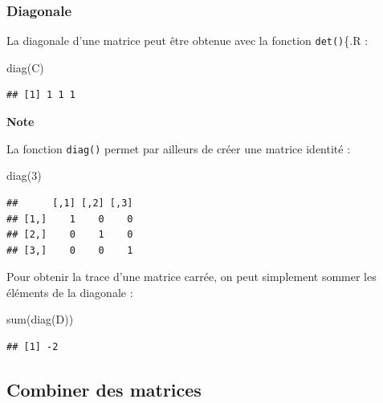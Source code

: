 \documentclass[
  11pt,
]{book}
\newenvironment{Shaded}{\begin{snugshade}}{\end{snugshade}}
\newcommand{\DecValTok}[1]{\textcolor[rgb]{0.00,0.00,0.81}{#1}}
\newcommand{\FunctionTok}[1]{\textcolor[rgb]{0.00,0.00,0.00}{#1}}
\newcommand{\NormalTok}[1]{#1}
\numberwithin{equation}{section}
\numberwithin{countremarque}{section}
\newenvironment{notebox}{
  \begin{tcolorbox}[breakable, colback=jaune,coltext=black,
                  colframe=grisfonce]}
 {\end{tcolorbox}}
\begin{document}
\hypertarget{diagonale}{%
\subsubsection{Diagonale}\label{diagonale}}

La diagonale d'une matrice peut être obtenue avec la fonction \texttt{det()}\{.R :

\begin{Shaded}
\begin{Highlighting}[]
\FunctionTok{diag}\NormalTok{(C)}
\end{Highlighting}
\end{Shaded}

\begin{lstlisting}
## [1] 1 1 1
\end{lstlisting}

\begin{notebox}

\textbf{Note}

La fonction \texttt{diag()} permet par ailleurs de créer une matrice identité :

\begin{Shaded}
\begin{Highlighting}[]
\FunctionTok{diag}\NormalTok{(}\DecValTok{3}\NormalTok{)}
\end{Highlighting}
\end{Shaded}

\begin{lstlisting}
##      [,1] [,2] [,3]
## [1,]    1    0    0
## [2,]    0    1    0
## [3,]    0    0    1
\end{lstlisting}

\end{notebox}

Pour obtenir la trace d'une matrice carrée, on peut simplement sommer les éléments de la diagonale :

\begin{Shaded}
\begin{Highlighting}[]
\FunctionTok{sum}\NormalTok{(}\FunctionTok{diag}\NormalTok{(D))}
\end{Highlighting}
\end{Shaded}

\begin{lstlisting}
## [1] -2
\end{lstlisting}

\hypertarget{combiner-des-matrices}{%
\subsection{Combiner des matrices}\label{combiner-des-matrices}}
\end{document}
